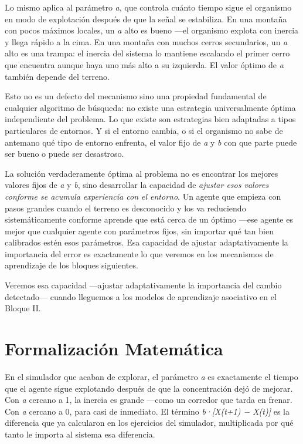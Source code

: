 \documentclass[
  letterpaper,
  DIV=11,
  numbers=noendperiod]{scrreprt}
\begin{document}
Lo mismo aplica al parámetro \emph{a}, que controla cuánto tiempo sigue
el organismo en modo de explotación después de que la señal se
estabiliza. En una montaña con pocos máximos locales, un \emph{a} alto
es bueno ---el organismo explota con inercia y llega rápido a la cima.
En una montaña con muchos cerros secundarios, un \emph{a} alto es una
trampa: el inercia del sistema lo mantiene escalando el primer cerro que
encuentra aunque haya uno más alto a su izquierda. El valor óptimo de
\emph{a} también depende del terreno.

Esto no es un defecto del mecanismo sino una propiedad fundamental de
cualquier algoritmo de búsqueda: no existe una estrategia universalmente
óptima independiente del problema. Lo que existe son estrategias bien
adaptadas a tipos particulares de entornos. Y si el entorno cambia, o si
el organismo no sabe de antemano qué tipo de entorno enfrenta, el valor
fijo de \emph{a} y \emph{b} con que parte puede ser bueno o puede ser
desastroso.

La solución verdaderamente óptima al problema no es encontrar los
mejores valores fijos de \emph{a} y \emph{b}, sino desarrollar la
capacidad de \emph{ajustar esos valores conforme se acumula experiencia
con el entorno}. Un agente que empieza con pasos grandes cuando el
terreno es desconocido y los va reduciendo sistemáticamente conforme
aprende que está cerca de un óptimo ---ese agente es mejor que cualquier
agente con parámetros fijos, sin importar qué tan bien calibrados estén
esos parámetros. Esa capacidad de ajustar adaptativamente la importancia
del error es exactamente lo que veremos en los mecanismos de aprendizaje
de los bloques siguientes.

Veremos esa capacidad ---ajustar adaptativamente la importancia del
cambio detectado--- cuando lleguemos a los modelos de aprendizaje
asociativo en el Bloque II.

\section{Formalización Matemática}\label{formalizaciuxf3n-matemuxe1tica}

En el simulador que acaban de explorar, el parámetro \emph{a} es
exactamente el tiempo que el agente sigue explotando después de que la
concentración dejó de mejorar. Con \emph{a} cercano a 1, la inercia es
grande ---como un corredor que tarda en frenar. Con \emph{a} cercano a
0, para casi de inmediato. El término \emph{b·{[}X(t+1) − X(t){]}} es la
diferencia que ya calcularon en los ejercicios del simulador,
multiplicada por qué tanto le importa al sistema esa diferencia.
\end{document}

